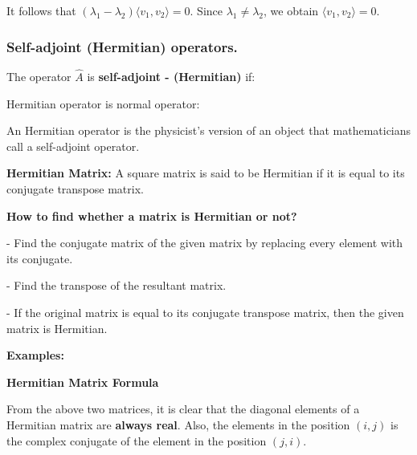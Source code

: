 \documentclass{article}
\begin{document}
It follows that $(\lambda_1 - \lambda_2)\langle v_1, v_2 \rangle = 0$. Since $\lambda_1 \neq \lambda_2$, we obtain
$\langle v_1, v_2 \rangle = 0$.



\subsubsection{Self-adjoint (Hermitian) operators.}

The operator $\hat{A}$ is \textbf{self-adjoint - (Hermitian)} if:

Hermitian operator is normal operator:



An Hermitian operator is the physicist's version of an object that mathematicians call a self-adjoint operator.


\textbf{Hermitian Matrix:} A square matrix is said to be Hermitian if it is equal to its conjugate transpose matrix.

\textbf{How to find whether a matrix is Hermitian or not?}

- Find the conjugate matrix of the given matrix by replacing every element with its conjugate.

- Find the transpose of the resultant matrix.

- If the original matrix is equal to its conjugate transpose matrix, then the given matrix is Hermitian.


\textbf{Examples:}



\textbf{Hermitian Matrix Formula}

From the above two matrices, it is clear that the diagonal elements of a Hermitian matrix are \textbf{always real}. Also, the elements in the position $(i,j)$ is the complex conjugate of the element in the position $(j,i)$.
\end{document}
